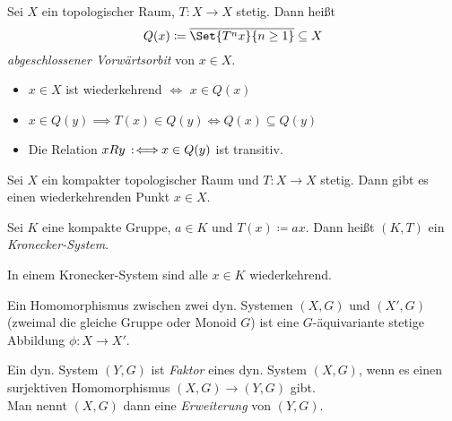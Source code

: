 \documentclass{cheat-sheet}
\newcommand{\clos}[1]{\overline{#1}} %
\begin{document}
\begin{defn}
  Sei $X$ ein topologischer Raum, $T : X \to X$ stetig. Dann heißt
  \[ Q(x) \coloneqq \clos{\Set{T^n x}{n \geq 1}} \subseteq X \]
  \emph{abgeschlossener Vorwärtsorbit} von $x \in X$.
\end{defn}

\begin{lem}
  \begin{itemize}
    \item $x \in X$ ist wiederkehrend $\iff$ $x \in Q(x)$
    \item $x \in Q(y) \implies T(x) \in Q(y) \iff Q(x) \subseteq Q(y)$
    \item Die Relation $xRy \!\!\enspace:\!\iff\!\! x \in Q(y)$ ist transitiv.
  \end{itemize}
\end{lem}

\begin{thm}
  Sei $X$ ein kompakter topologischer Raum und $T : X \to X$ stetig.
  Dann gibt es einen wiederkehrenden Punkt $x \in X$.
\end{thm}

\begin{defn}
  Sei $K$ eine kompakte Gruppe, $a \in K$ und $T(x) \coloneqq ax$. Dann heißt $(K, T)$ ein \emph{Kronecker-System}.
\end{defn}

\begin{thm}
  In einem Kronecker-System sind alle $x \in K$ wiederkehrend.
\end{thm}


\begin{defn}
  Ein Homomorphismus zwischen zwei dyn. Systemen $(X, G)$ und $(X', G)$ (zweimal die gleiche Gruppe oder Monoid $G$) ist eine $G$-äquivariante stetige Abbildung $\phi : X \to X'$.
\end{defn}

\begin{defn}
  Ein dyn. System $(Y, G)$ ist \emph{Faktor} eines dyn. System $(X, G)$, wenn es einen surjektiven Homomorphismus $(X, G) \to (Y, G)$ gibt. \\
  Man nennt $(X, G)$ dann eine \emph{Erweiterung} von $(Y, G)$.
\end{defn}
\end{document}
